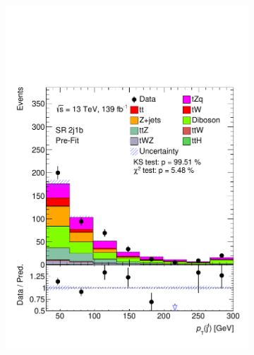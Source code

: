 \begin{figure}[!h]
\begin{subfigure}[b]{0.33\linewidth}
    \includegraphics[width=\linewidth]{ubonn-thesis/Chapters/Chapters_06/Figure/Input_distribution/SR_2j1b_forwardjet_pt.pdf} 
  \end{subfigure}%
  \begin{subfigure}[b]{0.33\linewidth}
    \centering

\end{subfigure}
\end{figure}
